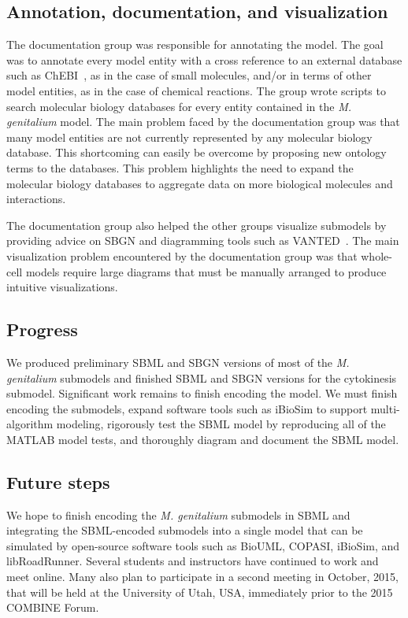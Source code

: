 \documentclass[journal,transmag]{IEEEtran}
\begin{document}
\subsection{Annotation, documentation, and visualization}
The documentation group was responsible for annotating the model.
The goal was to annotate every model entity with a cross reference to an external database such as ChEBI~\cite{Hastings2013}, as in the case of small molecules, and/or in terms of other model entities, as in the case of chemical reactions.
The group wrote scripts to search molecular biology databases for every entity contained in the \textit{M. genitalium} model.
The main problem faced by the documentation group was that many model entities are not currently represented by any molecular biology database.
This shortcoming can easily be overcome by proposing new ontology terms to the databases.
This problem highlights the need to expand the molecular biology databases to aggregate data on more biological molecules and interactions. 

The documentation group also helped the other groups visualize submodels by providing advice on SBGN and diagramming tools such as VANTED~\cite{Rohn2012}.
The main visualization problem encountered by the documentation group was that whole-cell models require large diagrams that must be manually arranged to produce intuitive visualizations.

\subsection{Progress}
We produced preliminary SBML and SBGN versions of most of the \textit{M. genitalium} submodels and finished SBML and SBGN versions for the cytokinesis submodel. Significant work remains to finish encoding the model. We must finish encoding the submodels, expand software tools such as iBioSim to support multi-algorithm modeling, rigorously test the SBML model by reproducing all of the MATLAB model tests, and thoroughly diagram and document the SBML model.

\subsection{Future steps}
We hope to finish encoding the \textit{M. genitalium} submodels in SBML and integrating the SBML-encoded submodels into a single model that can be simulated by open-source software tools such as BioUML, COPASI, iBioSim, and libRoadRunner. Several students and instructors have continued to work and meet online. Many also plan to participate in a second meeting in October, 2015, that will be held at the University of Utah, USA, immediately prior to the 2015 COMBINE Forum.
\end{document}
